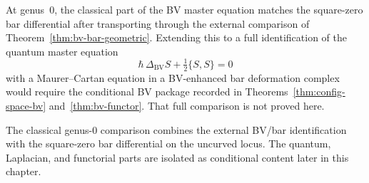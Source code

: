 \begin{remark}
\label{rem:qme-bar-cobar}
At genus~$0$, the classical part of the BV master equation matches the
square-zero bar differential after transporting through the external
comparison of Theorem~\ref{thm:bv-bar-geometric}. Extending this to a
full identification of the quantum master equation
\[
\hbar\,\Delta_{\mathrm{BV}}S + \tfrac{1}{2}\{S,S\}=0
\]
with a Maurer--Cartan equation in a BV-enhanced bar deformation
complex would require the conditional BV package recorded in
Theorems~\ref{thm:config-space-bv} and~\ref{thm:bv-functor}. That
full comparison is not proved here.

The classical genus-$0$ comparison combines the external BV/bar
identification with the square-zero bar differential on the
uncurved locus. The quantum, Laplacian, and functorial parts are
isolated as conditional content later in this chapter.
\end{remark}

